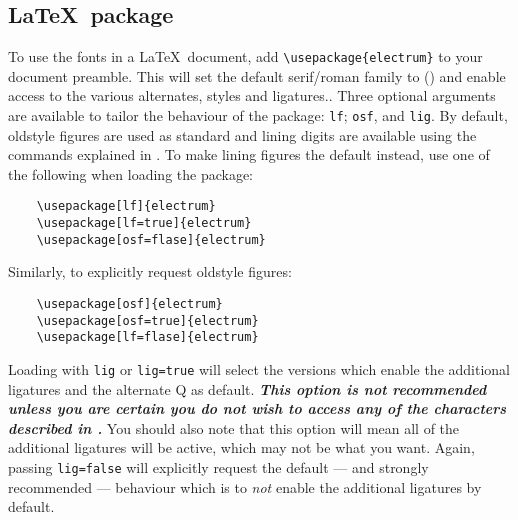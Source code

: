 \documentclass[11pt,british]{article}
\begin{document}
\subsection{\LaTeX\ package}

To use the fonts in a \LaTeX\ document, add \verb|\usepackage{electrum}| to your document preamble. This will set the default serif/roman family to  () and enable access to the various alternates, styles and ligatures.. Three optional arguments are available to tailor the behaviour of the package: \verb|lf|; \verb|osf|, and \verb|lig|. By default, oldstyle figures are used as standard and lining digits are available using the commands explained in . To make lining figures the default instead, use one of the following when loading the package:
\begin{verbatim}
	\usepackage[lf]{electrum}
	\usepackage[lf=true]{electrum}
	\usepackage[osf=flase]{electrum}	
\end{verbatim}
Similarly, to explicitly request oldstyle figures:
\begin{verbatim}
	\usepackage[osf]{electrum}
	\usepackage[osf=true]{electrum}
	\usepackage[lf=flase]{electrum}	
\end{verbatim}

Loading  with \verb|lig| or \verb|lig=true| will select the versions which enable the additional ligatures and the alternate Q as default. \textbf{\emph{This option is not recommended unless you are \emph{certain} you do not wish to access any of the characters described in .}} You should also note that this option will mean all of the additional ligatures will be active, which may not be what you want. Again, passing \verb|lig=false| will explicitly request the default --- and strongly recommended --- behaviour which is to \emph{not} enable the additional ligatures by default.
	
\end{document}

